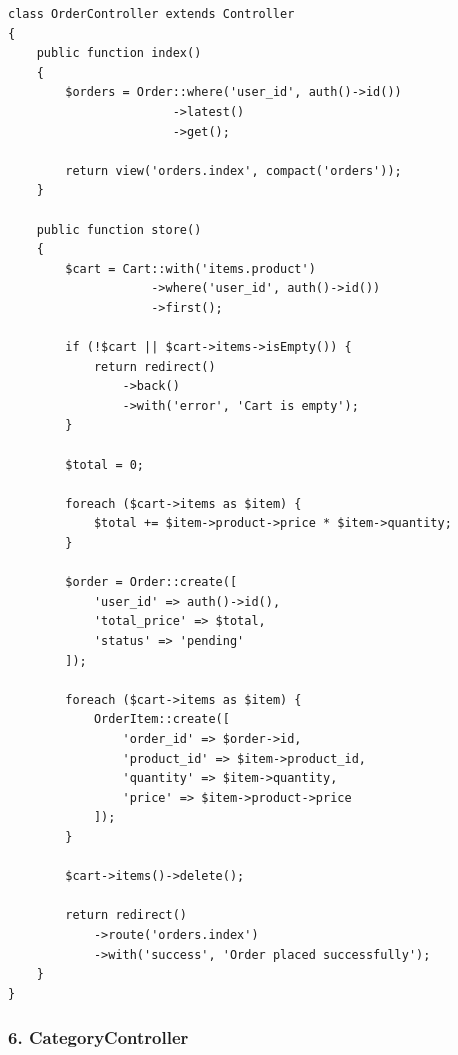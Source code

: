 \documentclass[12pt,a4paper]{article}
\begin{document}
\begin{verbatim}
class OrderController extends Controller
{
    public function index()
    {
        $orders = Order::where('user_id', auth()->id())
                       ->latest()
                       ->get();

        return view('orders.index', compact('orders'));
    }

    public function store()
    {
        $cart = Cart::with('items.product')
                    ->where('user_id', auth()->id())
                    ->first();

        if (!$cart || $cart->items->isEmpty()) {
            return redirect()
                ->back()
                ->with('error', 'Cart is empty');
        }

        $total = 0;

        foreach ($cart->items as $item) {
            $total += $item->product->price * $item->quantity;
        }

        $order = Order::create([
            'user_id' => auth()->id(),
            'total_price' => $total,
            'status' => 'pending'
        ]);

        foreach ($cart->items as $item) {
            OrderItem::create([
                'order_id' => $order->id,
                'product_id' => $item->product_id,
                'quantity' => $item->quantity,
                'price' => $item->product->price
            ]);
        }

        $cart->items()->delete();

        return redirect()
            ->route('orders.index')
            ->with('success', 'Order placed successfully');
    }
}
\end{verbatim}
\subsubsection{6. CategoryController}
\end{document}
